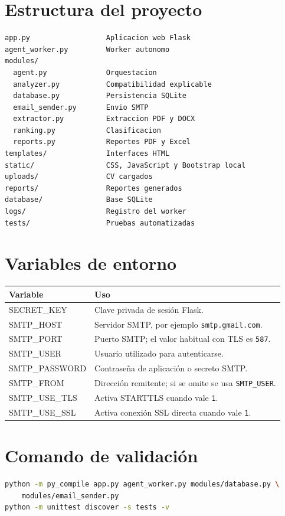 \documentclass[12pt,a4paper]{article}
\begin{document}
\appendix
\section{Estructura del proyecto}

\begin{lstlisting}[caption={Estructura principal de carpetas.}]
app.py                  Aplicacion web Flask
agent_worker.py         Worker autonomo
modules/
  agent.py              Orquestacion
  analyzer.py           Compatibilidad explicable
  database.py           Persistencia SQLite
  email_sender.py       Envio SMTP
  extractor.py          Extraccion PDF y DOCX
  ranking.py            Clasificacion
  reports.py            Reportes PDF y Excel
templates/              Interfaces HTML
static/                 CSS, JavaScript y Bootstrap local
uploads/                CV cargados
reports/                Reportes generados
database/               Base SQLite
logs/                   Registro del worker
tests/                  Pruebas automatizadas
\end{lstlisting}

\section{Variables de entorno}

\begin{longtable}{>{\ttfamily}p{4.1cm}>{\raggedright\arraybackslash}p{10.1cm}}
\toprule
\textbf{Variable} & \textbf{Uso} \\
\midrule
SECRET\_KEY & Clave privada de sesión Flask. \\
SMTP\_HOST & Servidor SMTP, por ejemplo \texttt{smtp.gmail.com}. \\
SMTP\_PORT & Puerto SMTP; el valor habitual con TLS es \texttt{587}. \\
SMTP\_USER & Usuario utilizado para autenticarse. \\
SMTP\_PASSWORD & Contraseña de aplicación o secreto SMTP. \\
SMTP\_FROM & Dirección remitente; si se omite se usa \texttt{SMTP\_USER}. \\
SMTP\_USE\_TLS & Activa STARTTLS cuando vale \texttt{1}. \\
SMTP\_USE\_SSL & Activa conexión SSL directa cuando vale \texttt{1}. \\
\bottomrule
\end{longtable}

\section{Comando de validación}

\begin{lstlisting}[language=bash]
python -m py_compile app.py agent_worker.py modules/database.py \
    modules/email_sender.py
python -m unittest discover -s tests -v
\end{lstlisting}
\end{document}
